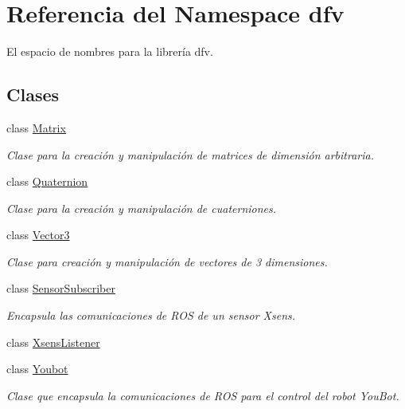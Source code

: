\hypertarget{namespacedfv}{\section{\-Referencia del \-Namespace dfv}
\label{namespacedfv}
}


\-El espacio de nombres para la librería dfv.  


\subsection*{\-Clases}
\begin{DoxyCompactItemize}
\item 
class \hyperlink{classdfv_1_1Matrix}{\-Matrix}
\begin{DoxyCompactList}\small\item\em \-Clase para la creación y manipulación de matrices de dimensión arbitraria. \end{DoxyCompactList}\item 
class \hyperlink{classdfv_1_1Quaternion}{\-Quaternion}
\begin{DoxyCompactList}\small\item\em \-Clase para la creación y manipulación de cuaterniones. \end{DoxyCompactList}\item 
class \hyperlink{classdfv_1_1Vector3}{\-Vector3}
\begin{DoxyCompactList}\small\item\em \-Clase para creación y manipulación de vectores de 3 dimensiones. \end{DoxyCompactList}\item 
class \hyperlink{classdfv_1_1SensorSubscriber}{\-Sensor\-Subscriber}
\begin{DoxyCompactList}\small\item\em \-Encapsula las comunicaciones de \-R\-O\-S de un sensor \-Xsens. \end{DoxyCompactList}\item 
class \hyperlink{classdfv_1_1XsensListener}{\-Xsens\-Listener}
\item 
class \hyperlink{classdfv_1_1Youbot}{\-Youbot}
\begin{DoxyCompactList}\small\item\em \-Clase que encapsula la comunicaciones de \-R\-O\-S para el control del robot \-You\-Bot. \end{DoxyCompactList}\end{DoxyCompactItemize}
